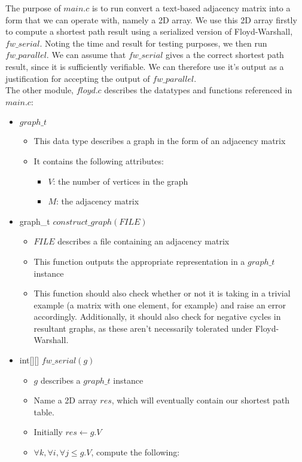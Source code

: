 \documentclass[]{article}
\begin{document}
	The purpose of $main.c$ is to run convert a text-based adjacency matrix into a form that we can operate with, namely a 2D array. We use this 2D array firstly to compute a shortest path result using a serialized version of Floyd-Warshall, $fw\_serial$. Noting the time and result for testing purposes, we then run $fw\_parallel$. We can assume that $fw\_serial$ gives a the correct shortest path result, since it is sufficiently verifiable. We can therefore use it's output as a justification for accepting the output of $fw\_parallel$.
	\\
	The other module, $floyd.c$ describes the datatypes and functions referenced in $main.c$:
	\begin{itemize}
		\item $graph\_t$
		\begin{itemize}
			\item This data type describes a graph in the form of an adjacency matrix
			\item It contains the following attributes:
			\begin{itemize}
				\item $V$: the number of vertices in the graph
				\item $M$: the adjacency matrix
			\end{itemize}
		\end{itemize}
		\item graph\_t  $construct\_graph(FILE)$
		\begin{itemize}
			\item $FILE$ describes a file containing an adjacency matrix
			\item This function outputs the appropriate representation in a $graph\_t$ instance
			\item This function should also check whether or not it is taking in a trivial example (a matrix with one element, for example) and raise an error accordingly. Additionally, it should also check for negative cycles in resultant graphs, as these aren't necessarily tolerated under Floyd-Warshall.
		\end{itemize}
		\item int[][] $fw\_serial(g)$
		\begin{itemize}
			\item $g$ describes a $graph\_t$ instance
			\item Name a 2D array $res$, which will  eventually contain our shortest path table.
			\item Initially $res \leftarrow g.V$
			\item $\forall k, \forall i, \forall j \leq g.V$, compute the following:

\end{itemize}
\end{itemize}
\end{document}
